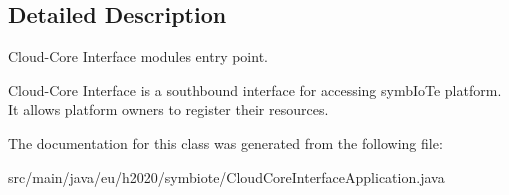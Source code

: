\subsection{Detailed Description}
Cloud-\/\+Core Interface module\textquotesingle{}s entry point. 

Cloud-\/\+Core Interface is a southbound interface for accessing symb\+Io\+Te platform. It allows platform owners to register their resources. 

The documentation for this class was generated from the following file\+:\begin{DoxyCompactItemize}
\item 
src/main/java/eu/h2020/symbiote/Cloud\+Core\+Interface\+Application.\+java\end{DoxyCompactItemize}
